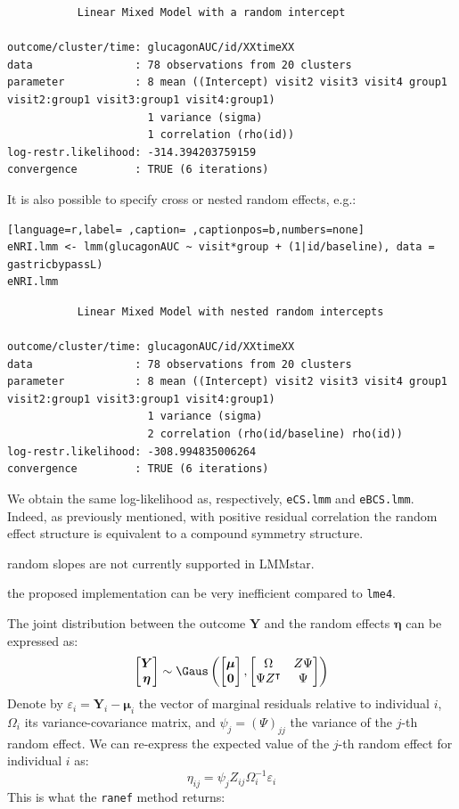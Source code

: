 \documentclass[12pt]{article}
\newcommand\Warning[1][3ex]{%
\renewcommand\stacktype{L}%
\scaleto{\stackon[1.3pt]{\color{red}$\triangle$}{\tiny\bfseries !}}{#1}%
\xspace
}
\newcommand\trans[1]{{#1}^\intercal}%
\newcommand\Veta{\boldsymbol{\eta}}
\newcommand{\VY}{\boldsymbol{Y}}
\begin{document}
\begin{verbatim}
	       Linear Mixed Model with a random intercept 

outcome/cluster/time: glucagonAUC/id/XXtimeXX 
data                : 78 observations from 20 clusters 
parameter           : 8 mean ((Intercept) visit2 visit3 visit4 group1 visit2:group1 visit3:group1 visit4:group1) 
                      1 variance (sigma) 
                      1 correlation (rho(id)) 
log-restr.likelihood: -314.394203759159 
convergence         : TRUE (6 iterations)
\end{verbatim}


It is also possible to specify cross or nested random effects, e.g.:
\begin{lstlisting}[language=r,label= ,caption= ,captionpos=b,numbers=none]
eNRI.lmm <- lmm(glucagonAUC ~ visit*group + (1|id/baseline), data = gastricbypassL)
eNRI.lmm
\end{lstlisting}

\begin{verbatim}
	       Linear Mixed Model with nested random intercepts 

outcome/cluster/time: glucagonAUC/id/XXtimeXX 
data                : 78 observations from 20 clusters 
parameter           : 8 mean ((Intercept) visit2 visit3 visit4 group1 visit2:group1 visit3:group1 visit4:group1) 
                      1 variance (sigma) 
                      2 correlation (rho(id/baseline) rho(id)) 
log-restr.likelihood: -308.994835006264 
convergence         : TRUE (6 iterations)
\end{verbatim}


We obtain the same log-likelihood as, respectively, \texttt{eCS.lmm} and
\texttt{eBCS.lmm}. Indeed, as previously mentioned, with positive residual
correlation the random effect structure is equivalent to a compound
symmetry structure. \newline \Warning random slopes are not currently
supported in LMMstar. \newline \Warning the proposed implementation can
be very inefficient compared to \texttt{lme4}.

\bigskip

The joint distribution between the outcome \(\VY\)
and the random effects \(\Veta\) can be expressed as:
\[
\begin{bmatrix} \VY \\ \Veta \end{bmatrix} \sim \Gaus\left(\begin{bmatrix} \boldsymbol{\mu} \\ \mathbf{0} \end{bmatrix}, \begin{bmatrix} \Omega & Z \Psi \\ \Psi \trans{Z} & \Psi \end{bmatrix}\right)
\]
Denote by \(\varepsilon_i=\VY_i-\boldsymbol{\mu}_i\) the vector of
marginal residuals relative to individual \(i\), \(\Omega_i\) its
variance-covariance matrix, and \(\psi_j=(\Psi)_{jj}\) the variance of the
\(j\)-th random effect. We can re-express the expected value of the
\(j\)-th random effect for individual \(i\) as:
\[ \eta_{ij} = \psi_{j} Z_{ij} \Omega_i^{-1}\varepsilon_i \]
This is what the \texttt{ranef} method returns:
\end{document}
